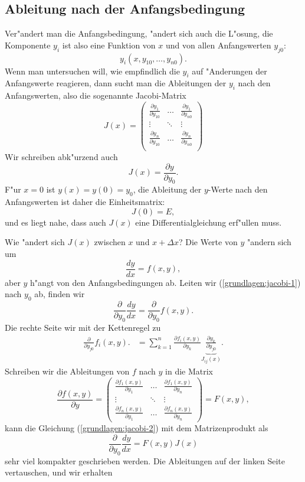 \subsection{Ableitung nach der Anfangsbedingung}
Ver"andert man die Anfangsbedingung, "andert sich auch die L"osung,
die Komponente $y_i$ ist also eine Funktion von $x$ und
von allen Anfangswerten $y_{j0}$:
\[
y_i(x, y_{10},\dots,y_{n0}).
\]
Wenn man untersuchen will, wie empfindlich die $y_i$ auf "Anderungen
der Anfangswerte reagieren, dann sucht man die Ableitungen der $y_i$
nach den Anfangswerten, also die sogenannte Jacobi-Matrix
\[
J(x)
=
\begin{pmatrix}
\displaystyle\frac{\partial y_1}{\partial y_{10}}&\dots&
	\displaystyle\frac{\partial y_1}{\partial y_{n0}}\\
\vdots&\ddots&\vdots\\
\displaystyle\frac{\partial y_n}{\partial y_{10}}&\dots&
	\displaystyle\frac{\partial y_n}{\partial y_{n0}}\\
\end{pmatrix}
\]
Wir schreiben abk"urzend auch 
\[
J(x)= \frac{\partial y}{\partial y_0}.
\]
F"ur $x=0$ ist $y(x)=y(0)=y_0$, die Ableitung der $y$-Werte nach den
Anfangswerten ist daher die Einheitsmatrix:
\[
J(0)=E,
\]
und es liegt nahe, dass auch $J(x)$ eine Differentialgleichung erf"ullen
muss.

Wie "andert sich $J(x)$ zwischen $x$ und $x+\Delta x$?
Die Werte von $y$ "andern sich um
\begin{equation}
\frac{dy}{dx}= f(x,y),
\label{grundlagen:jacobi-1}
\end{equation}
aber $y$ h"angt von den Anfangsbedingungen ab.
Leiten wir (\ref{grundlagen:jacobi-1}) nach $y_0$ ab, finden wir
\begin{equation}
\frac{\partial}{\partial y_0}\frac{dy}{dx}
=
\frac{\partial}{\partial y_0}f(x,y).
\label{grundlagen:jacobi-2}
\end{equation}
Die rechte Seite wir mit der Kettenregel zu
\begin{align*}
\frac{\partial}{\partial y_{j0}}f_i(x,y).
&=
\sum_{k=1}^n \frac{\partial f_i(x,y)}{\partial y_{k}}
\underbrace{\frac{\partial y_k}{\partial y_{j0}}}_{J_{ij}(x)}.
\end{align*}
Schreiben wir die Ableitungen von $f$ nach $y$ in die Matrix
\[
\frac{\partial f(x,y)}{\partial y}
=
\begin{pmatrix}
\displaystyle\frac{\partial f_1(x,y)}{\partial y_1}&\dots&
	\displaystyle\frac{\partial f_1(x,y)}{\partial y_n}\\
\vdots&\ddots&\vdots\\
\displaystyle\frac{\partial f_n(x,y)}{\partial y_1}&\dots&
	\displaystyle\frac{\partial f_n(x,y)}{\partial y_n}
\end{pmatrix}
=F(x,y),
\]
kann die Gleichung (\ref{grundlagen:jacobi-2}) mit dem Matrizenprodukt als
\begin{equation*}
\frac{\partial}{\partial y_0}\frac{dy}{dx}
=
F(x,y)J(x)
\end{equation*}
sehr viel kompakter geschrieben werden.
Die Ableitungen auf der linken Seite vertauschen, und wir erhalten

